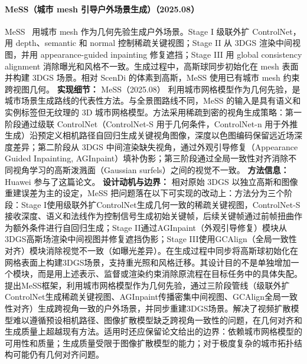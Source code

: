 \paragraph{MeSS（城市 mesh 引导户外场景生成）（2025.08）}
MeSS~\cite{2508_15169} 用城市 mesh 作为几何先验生成户外场景。Stage I 级联外扩 ControlNet，用 depth、semantic 和 normal 控制稀疏关键视图；Stage II 从 3DGS 渲染中间视图，并用 appearance-guided inpainting 修复遮挡；Stage III 用 global consistency alignment 消除曝光和风格不一致。生成过程中，高斯球同步初始化在 mesh 表面并构建 3DGS 场景。相对 ScenDi 的体素到高斯，MeSS 使用已有城市 mesh 约束跨视图几何。
\textbf{实现细节：} MeSS（2025.08） 利用城市网格模型作为几何先验，是城市场景生成路线的代表性方法。与全景图路线不同，MeSS 的输入是具有语义和实例标签但无纹理的 3D 城市网格模型。方法采用稀疏到密的视角生成策略：第一阶段通过级联 ControlNet（ControlNet-S 用于几何条件，ControlNet-n 用于外推生成）沿预定义相机路径自回归生成关键视角图像，深度以色图编码保留远近场深度差异；第二阶段从 3DGS 中间渲染缺失视角，通过外观引导修复（Appearance Guided Inpainting, AGInpaint）填补伪影；第三阶段通过全局一致性对齐消除不同视角学习的高斯泼溅面（Gaussian surfels）之间的视觉不一致。
\textbf{方法信息：} Huawei 参与了这篇论文。
\textbf{设计动机与边界：} 相对原始 3DGS 以独立高斯和图像重建误差为主的设定，MeSS 把问题落在以下可实现的改动上：方法分为三个阶段：Stage I使用级联外扩ControlNet生成几何一致的稀疏关键视图，ControlNet-S接收深度、语义和法线作为控制信号生成初始关键帧，后续关键帧通过前帧扭曲作为额外条件进行自回归生成；Stage II通过AGInpaint（外观引导修复）模块从3DGS高斯场渲染中间视图并修复遮挡伪影；Stage III使用GCAlign（全局一致性对齐）模块消除视觉不一致（如曝光差异）。在生成过程中同步将高斯球初始化在网格表面上构建3DGS场景，支持重光照和风格迁移。其设计目的不是单独增加一个模块，而是用上述表示、监督或渲染约束消除原流程在目标任务中的具体失配。提出MeSS框架，利用城市网格模型作为几何先验，通过三阶段管线（级联外扩ControlNet生成稀疏关键视图、AGInpaint传播密集中间视图、GCAlign全局一致性对齐）生成跨视角一致的户外场景，并同步重建3DGS场景。解决了视频扩散模型难以遵循预设相机路径、图像扩散模型缺乏跨视角一致性的问题，在几何对齐和生成质量上超越现有方法。适用时还应保留论文给出的边界：依赖城市网格模型的可用性和质量；生成质量受限于图像扩散模型的能力；对于极度复杂的城市拓扑结构可能仍有几何对齐问题。
